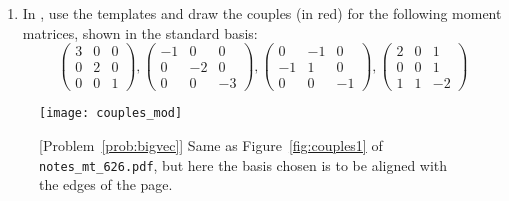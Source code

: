 \documentclass[11pt,titlepage,fleqn]{article}
\newcommand{\mtfile}{\texttt{notes\_mt\_626.pdf}}
\begin{document}
\begin{enumerate}

\item 
\label{prob:arrows}
In , use the templates and draw the couples (in red) for the following moment matrices, shown in the standard basis:
%
\begin{equation*}
\begin{pmatrix} 3 &  0 & 0 \\  0 & 2 & 0 \\ 0 & 0 &  1 \end{pmatrix},
\begin{pmatrix} -1 &  0 & 0 \\  0 & -2 & 0 \\ 0 & 0 & -3 \end{pmatrix},
\begin{pmatrix} 0 & -1 & 0 \\ -1 & 1 & 0 \\ 0 & 0 & -1 \end{pmatrix},
\begin{pmatrix} 2 &  0 & 1 \\  0 & 0 & 1 \\ 1 & 1 & -2 \end{pmatrix}
\end{equation*}


\end{enumerate}




\begin{figure}
\centering
\texttt{[image: couples\_mod]}
\caption{
[Problem~\ref{prob:bigvec}] Same as Figure~\ref{fig:couples1} of \mtfile, but here the basis chosen is to be aligned with the edges of the page.
\label{fig:template}
}
\end{figure}
\end{document}
